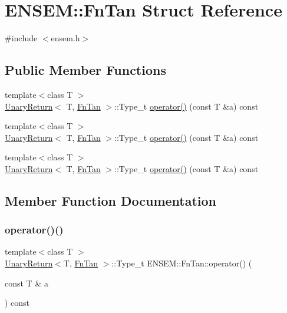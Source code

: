 \hypertarget{structENSEM_1_1FnTan}{}\section{E\+N\+S\+EM\+:\+:Fn\+Tan Struct Reference}
\label{structENSEM_1_1FnTan}


{\ttfamily \#include $<$ensem.\+h$>$}

\subsection*{Public Member Functions}
\begin{DoxyCompactItemize}
\item 
{\footnotesize template$<$class T $>$ }\\\mbox{\hyperlink{structENSEM_1_1UnaryReturn}{Unary\+Return}}$<$ T, \mbox{\hyperlink{structENSEM_1_1FnTan}{Fn\+Tan}} $>$\+::Type\+\_\+t \mbox{\hyperlink{structENSEM_1_1FnTan_ac94aaabe2436b8699faf802a7365e342}{operator()}} (const T \&a) const
\item 
{\footnotesize template$<$class T $>$ }\\\mbox{\hyperlink{structENSEM_1_1UnaryReturn}{Unary\+Return}}$<$ T, \mbox{\hyperlink{structENSEM_1_1FnTan}{Fn\+Tan}} $>$\+::Type\+\_\+t \mbox{\hyperlink{structENSEM_1_1FnTan_ac94aaabe2436b8699faf802a7365e342}{operator()}} (const T \&a) const
\item 
{\footnotesize template$<$class T $>$ }\\\mbox{\hyperlink{structENSEM_1_1UnaryReturn}{Unary\+Return}}$<$ T, \mbox{\hyperlink{structENSEM_1_1FnTan}{Fn\+Tan}} $>$\+::Type\+\_\+t \mbox{\hyperlink{structENSEM_1_1FnTan_ac94aaabe2436b8699faf802a7365e342}{operator()}} (const T \&a) const
\end{DoxyCompactItemize}


\subsection{Member Function Documentation}
\mbox{\label{structENSEM_1_1FnTan_ac94aaabe2436b8699faf802a7365e342}} 
\subsubsection{\texorpdfstring{operator()()}{operator()()}\hspace{0.1cm}{\footnotesize\ttfamily [1/3]}}
{\footnotesize\ttfamily template$<$class T $>$ \\
\mbox{\hyperlink{structENSEM_1_1UnaryReturn}{Unary\+Return}}$<$T, \mbox{\hyperlink{structENSEM_1_1FnTan}{Fn\+Tan}} $>$\+::Type\+\_\+t E\+N\+S\+E\+M\+::\+Fn\+Tan\+::operator() (\begin{DoxyParamCaption}\item[{const T \&}]{a }\end{DoxyParamCaption}) const\hspace{0.3cm}{\ttfamily [inline]}}

